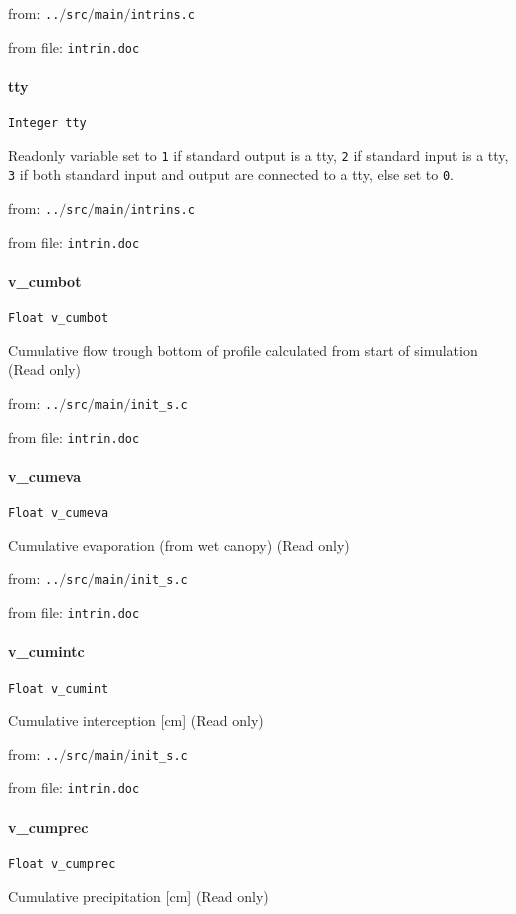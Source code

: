 from: {\tt ..$/$src$/$main$/$intrins.c}

from file: {\tt intrin.doc}


\paragraph{tty}
\begin{verbatim}
Integer tty
\end{verbatim}
Readonly variable set to {\tt 1} if standard output is a tty, {\tt 2}
if standard input is a tty, {\tt 3} if both standard input and
output are connected to a tty, else set to {\tt 0}.


from: {\tt ..$/$src$/$main$/$intrins.c}

from file: {\tt intrin.doc}


\paragraph{v\_cumbot}
\begin{verbatim}
Float v_cumbot
\end{verbatim}
Cumulative flow trough bottom of profile calculated from start of
simulation (Read only)


from: {\tt ..$/$src$/$main$/$init\_s.c}

from file: {\tt intrin.doc}


\paragraph{v\_cumeva}
\begin{verbatim}
Float v_cumeva
\end{verbatim}
Cumulative evaporation (from wet canopy) (Read only) 


from: {\tt ..$/$src$/$main$/$init\_s.c}

from file: {\tt intrin.doc}


\paragraph{v\_cumintc}
\begin{verbatim}
Float v_cumint
\end{verbatim}
Cumulative interception [cm] (Read only) 


from: {\tt ..$/$src$/$main$/$init\_s.c}

from file: {\tt intrin.doc}


\paragraph{v\_cumprec}
\begin{verbatim}
Float v_cumprec
\end{verbatim}
Cumulative precipitation [cm] (Read only) 


